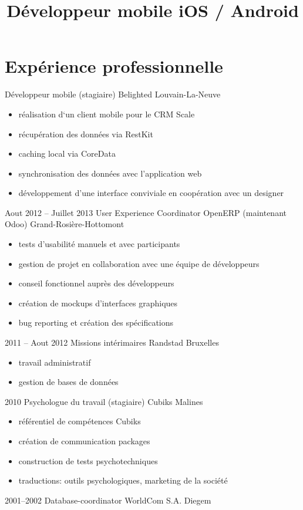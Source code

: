 \documentclass[11pt, a4paper]{moderncv}
\title{Développeur mobile iOS / Android}
\begin{document}
\makecvtitle
\section{Expérience professionnelle}
		{Développeur mobile (stagiaire)}
		{Belighted}
		{Louvain-La-Neuve}
		{}
		{
			\begin{itemize}
				\item réalisation d`un client mobile pour le CRM Scale
				\item récupération des données via RestKit
				\item caching local via CoreData
				\item synchronisation des données avec l’application web
				\item développement d’une interface conviviale en coopération avec un designer
			\end{itemize}
			}
	\cventry
		{Aout 2012  -- \linebreak Juillet 2013}
		{User Experience Coordinator}
		{OpenERP (maintenant Odoo)}
		{Grand-Rosière-Hottomont}
		{}
		{
			\begin{itemize}
				\item tests d’usabilité manuels et avec participants
				\item gestion de projet en collaboration avec une équipe de développeurs
				\item conseil fonctionnel  auprès des développeurs
				\item création de mockups d’interfaces graphiques
				\item bug reporting et création des spécifications
			\end{itemize}
			}
	
	\cventry
		{2011 -- \linebreak Aout 2012}
		{Missions intérimaires}
		{Randstad}
		{Bruxelles}
		{}
		{
			\begin{itemize}
				\item travail administratif
				\item gestion de bases de données
			\end{itemize}			
			}
	
	\cventry
		{2010}
		{Psychologue du travail (stagiaire)}
		{Cubiks}
		{Malines}
		{}
		{
			\begin{itemize}
				\item référentiel de compétences Cubiks
				\item création de  communication packages
				\item construction de tests psychotechniques
				\item traductions: outils psychologiques, marketing de la société
			\end{itemize}
			}
	\cventry
		{2001--2002}
		{Database-coordinator}
		{WorldCom S.A.}
		{Diegem}
		{}{}
\end{document}
